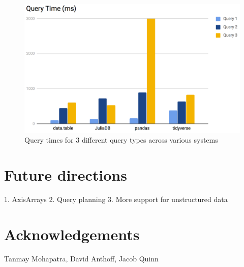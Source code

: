 \documentclass{juliacon}
\begin{document}
\begin{figure}[h]
\centering \includegraphics[width=5in]{image4.png} \caption{Query times for 3 different query types across various systems}
\label{fig:nyctaxiquery} 
\end{figure}

\section{Future directions}

1. AxisArrays
2. Query planning
3. More support for unstructured data

\section{Acknowledgements}

Tanmay Mohapatra, David Anthoff, Jacob Quinn
\end{document}
